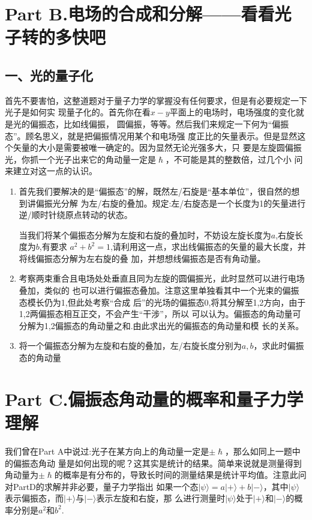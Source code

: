 \documentclass[utf8]{ctexart}
\begin{document}
\section*{Part B.电场的合成和分解——看看光子转的多快吧}
\subsection*{一、光的量子化}
首先不要害怕，这整道题对于量子力学的掌握没有任何要求，但是有必要规定一下光子是如何实 现量子化的。首先你在看$x-y$平面上的电场时，电场强度的变化就是光的偏振态，比如线偏振， 圆偏振，等等。然后我们来规定一下何为“偏振态”。顾名思义，就是把偏振情况用某个和电场强 度正比的矢量表示。但是显然这个矢量的大小是需要被唯一确定的。因为显然无论光强多大，只 要是左旋圆偏振光，你抓一个光子出来它的角动量一定是$\hslash $，不可能是其的整数倍，过几个小 问来建立对这一点的认识。
\begin{enumerate}
\def\labelenumi{(\arabic{enumi})}
\item 
  首先我们要解决的是“偏振态”的解，既然左/石旋是“基本单位”，很自然的想到讲偏振光分解 为左/右旋的叠加。规定:左/右旋态是一个长度为1的矢量进行逆/顺时针绕原点转动的状态。

  当我们将某个偏振态分解为左旋和右旋的叠加时，不妨设左旋长度为$a$,右旋长度为$b$,有要求 $a^2+b^2=1$,请利用这一点，求出线偏振态的矢量的最大长度，并将线偏振态分解为左右旋的叠 加，并想想线偏振态是否有角动量。
\item 
  考察两束重合且电场处处垂直且同为左旋的圆偏振光，此时显然可以进行电场叠加，类似的 也可以进行偏振态叠加。注意这里单独看其中一个光束的偏振态模长仍为1,但此处考察“合成 后”的光场的偏振态0,将其分解至1,2方向，由于1,2两偏振态相互正交，不会产生“干涉”，所以 可以认为。偏振态的角动量可分解为1,2偏振态的角动量之和.由此求出光的偏振态的角动量和模 长的关系。
\item 
  将一个偏振态分解为左旋和右旋的叠加，左/右旋长度分别为$a,b$，求此时偏振态的角动量
\end{enumerate}
\section*{Part C.偏振态角动量的概率和量子力学理解}
我们曾在Part A中说过:光子在某方向上的角动量一定是$\pm \hslash $，那么如同上一题中的偏振态角动 量是如何出现的呢？这其实是统计的结果。简单来说就是测量得到角动量为$\pm \hslash $的概率是有分布的，导致长时间的测量结果是统计平均值。注意此问对PartD的求解并非必要，量子力学指出 如果一个态$|\psi\rangle  =a|+\rangle + b |-\rangle $，其中$|\psi\rangle $表示偏振态，而$|+\rangle $与$|-\rangle $表示左旋和右旋，那 么进行测量时$|\psi\rangle $处于$| + \rangle $和$| -\rangle $的概率分别是$a^2$和$b^2$.
\end{document}
